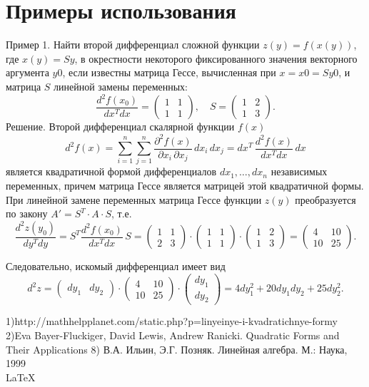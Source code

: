 \documentclass[a4paper,14pt]{report}
\newcommand\tab[1][1cm]{\hspace*{#1}}
\begin{document}
\section{Примеры использования}
\tab Пример 1. Найти второй дифференциал сложной функции $z(y)=f(x(y))$, где $x(y)=Sy$, в окрестности некоторого фиксированного значения векторного аргумента $y0$, если известны матрица Гессе, вычисленная при $x=x0=Sy0$, и матрица $S$
линейной замены переменных:
$$\frac{d^2f(x_0)}{dx^Tdx}
=\begin{pmatrix}
1&1\\
1&1
\end{pmatrix}\!,\quad 
S=
\begin{pmatrix}
1&2\\
1&3
\end{pmatrix}\!.$$
Решение. Второй дифференциал скалярной функции $f(x)$
$$d^2f(x)=\sum_{i=1}^{n}\sum_{j=1}^{n}\frac{\partial^2f(x)}{\partial x_i\,\partial x_j}\,dx_i\,dx_j= dx^T\,\frac{d^2f(x)}{dx^Tdx}\,dx$$
является квадратичной формой дифференциалов $dx_1,…,dx_n$
независимых переменных, причем матрица Гессе является матрицей этой квадратичной формы. При линейной замене переменных матрица Гессе функции $z(y)$ преобразуется по закону $A'=S^T\cdot A\cdot S$, т.е.
$$\frac{d^2z(y_0)}{dy^Tdy}= S^T\frac{d^2f(x_0)}{dx^Tdx}\,S= \begin{pmatrix}
1&1\\
2&3
\end{pmatrix}\!\cdot\! 
\begin{pmatrix}
1&1\\
1&1
\end{pmatrix}\!\cdot\! 
\begin{pmatrix} 
1&2\\
1&3
\end{pmatrix} = 
\begin{pmatrix} 
4&10\\
10&25
\end{pmatrix}\!.$$

Следовательно, искомый дифференциал имеет вид
$$d^2z=
\begin{pmatrix}
dy_1&dy_2
\end{pmatrix}\!\cdot\! 
\begin{pmatrix}
4&10\\
10&25 
\end{pmatrix}\!\cdot\! 
\begin{pmatrix}dy_1\\dy_2\end{pmatrix}= 4dy_1^2+20dy_1dy_2+25dy_2^2.$$




1)http://mathhelpplanet.com/static.php?p=linyeinye-i-kvadratichnye-formy
2)Eva Bayer-Fluckiger, David Lewis, Andrew Ranicki. Quadratic Forms and Their Applications
8) В.А. Ильин, Э.Г. Позняк. Линейная алгебра. М.: Наука, 1999
\\\LaTeX
\end{document}
